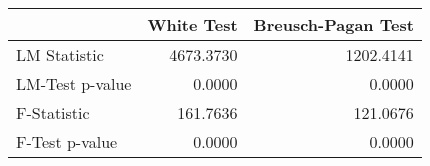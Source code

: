 \begin{tabular}{lrr}
\toprule
{} &  White Test &  Breusch-Pagan Test \\
\midrule
LM Statistic    &   4673.3730 &           1202.4141 \\
LM-Test p-value &      0.0000 &              0.0000 \\
F-Statistic     &    161.7636 &            121.0676 \\
F-Test p-value  &      0.0000 &              0.0000 \\
\bottomrule
\end{tabular}
